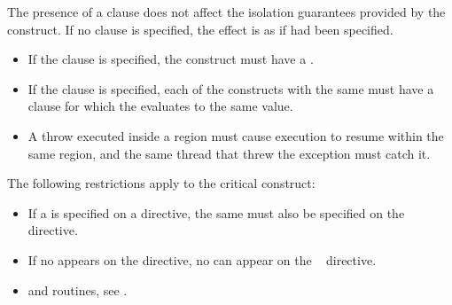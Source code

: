The presence of a  clause does not affect the isolation
guarantees provided by the  construct. If no
 clause is specified, the effect is as if 
had been specified.



\restrictions
\begin{itemize}
\item If the  clause is specified, the  
      construct must have a .
\item If the  clause is specified, each of the
   constructs with the same  must have a
   clause for which the  evaluates to the same
  value.

\end{itemize}

\cppspecificstart
\begin{itemize}
\item A throw executed inside a  region must cause execution to resume within 
the same  region, and the same thread that threw the exception must catch 
it.
\end{itemize}
\cppspecificend

\fortranspecificstart
The following restrictions apply to the critical construct:

\begin{itemize}
\item If a  is specified on a  directive, the same  must also be 
specified on the ~ directive. 

\item If no  appears on the  directive, no  can appear on the 
~ directive.
\end{itemize}
\fortranspecificend

\crossreferences
\begin{itemize}
\item {} and  routines, see .
\end{itemize}









